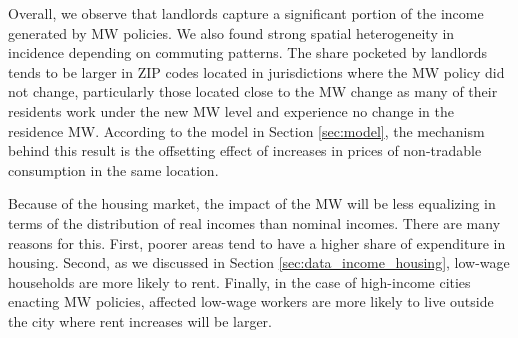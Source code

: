 Overall, we observe that landlords capture a significant portion of the income 
generated by MW policies.
We also found strong spatial heterogeneity in incidence depending on 
commuting patterns.
The share pocketed by landlords tends to be larger in ZIP codes located in 
jurisdictions where the MW policy did not change,
particularly those located close to the MW change as many of their residents
work under the new MW level and experience no change in the residence MW.
According to the model in Section \ref{sec:model}, the mechanism behind
this result is the offsetting effect of increases in prices of non-tradable 
consumption in the same location.

Because of the housing market, 
the impact of the MW will be less equalizing in terms of the distribution of
real incomes than nominal incomes.
There are many reasons for this.
First, poorer areas tend to have a higher share of expenditure in housing.
Second, as we discussed in Section \ref{sec:data_income_housing},
low-wage households are more likely to rent.
Finally, in the case of high-income cities enacting MW policies, affected 
low-wage workers are more likely to live outside the city where rent
increases will be larger.
